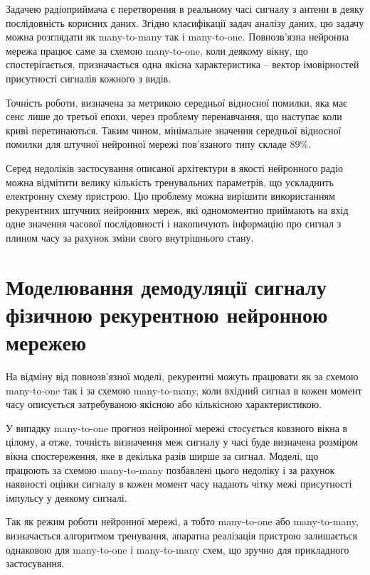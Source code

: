 Задачею радіоприймача є перетворення в реальному часі сигналу з антени в 
деяку послідовність корисних даних. Згідно класифікації задач аналізу даних, 
цю задачу можна розглядати як many-to-many так і many-to-one. Повнозв'язна 
нейронна мережа працює саме за схемою many-to-one, коли деякому вікну, що 
спостерігається, призначається одна якісна характеристика -- вектор 
імовірностей присутності сигналів кожного з видів.

Точність роботи, визначена за метрикою середньої відносної помилки, яка
має сенс лише до третьої епохи, через проблему перенавчання, що наступає 
коли криві перетинаються. Таким чином, мінімальне значення середньої 
відносної помилки для штучної нейронної мережі пов'язаного типу складе 
$ 89 \% $.

Серед недоліків застосування описаної архітектури в якості нейронного радіо
можна відмітити велику кількість тренувальних параметрів, що ускладнить 
електронну схему пристрою. Цю проблему можна вирішити використанням 
рекурентних штучних нейронних мереж, які одномоментно приймають на вхід 
одне значення часової послідовності і накопичують інформацію про сигнал 
з плином часу за рахунок зміни свого внутрішнього стану.

\section{Моделювання демодуляції сигналу фізичною рекурентною 
	нейронною мережею}

На відміну від повнозв'язної моделі, рекурентні можуть працювати як за схемою
many-to-one так і за схемою many-to-many, коли вхідний сигнал в кожен момент 
часу описується затребуваною якісною або кількісною характеристикою.

У випадку many-to-one прогноз нейронної мережі стосується ковзного 
вікна в цілому, а отже, точність визначення меж сигналу у часі буде визначена 
розміром вікна спостереження, яке в декілька разів ширше за сигнал. Моделі, 
що працюють за схемою many-to-many позбавлені цього недоліку і за рахунок 
наявності оцінки сигналу в кожен момент часу надають чітку межі присутності
імпульсу у деякому сигналі. 

Так як режим роботи нейронної мережі, а тобто many-to-one або many-to-many,
визначається алгоритмом тренування, апаратна реалізація пристрою залишається 
однаковою для many-to-one і many-to-many схем, що зручно для прикладного 
застосування.

